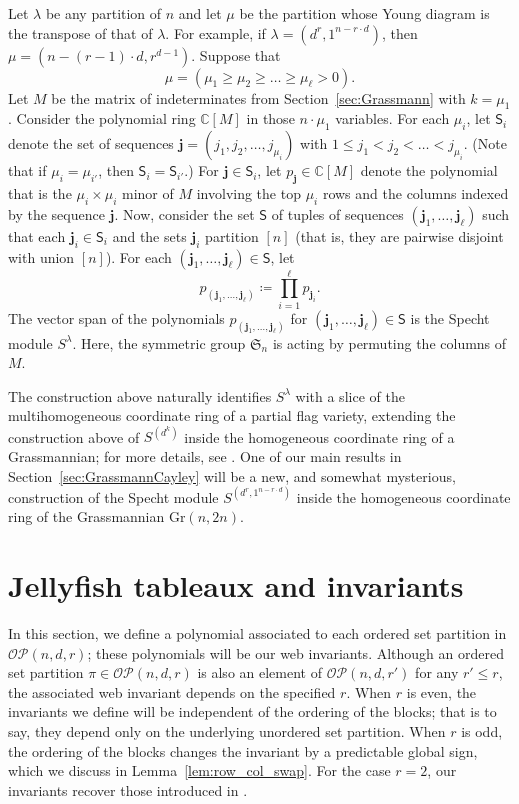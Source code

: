 \documentclass[10pt]{amsart}
\theoremstyle{definition}
\theoremstyle{plain}
\theoremstyle{plain}
\theoremstyle{definition}
\theoremstyle{remark}
\theoremstyle{plain}
\theoremstyle{plain}
\theoremstyle{plain}
\numberwithin{equation}{section}
\newcommand{\Gr}{\mathrm{Gr}}
\newcommand{\ordsetpart}{\mathcal{OP}}
\begin{document}
Let $\lambda$ be any partition of $n$ and let $\mu$ be the partition whose Young diagram is the transpose of that of $\lambda$. For example, if $\lambda = (d^r,1^{n - r \cdot d})$, then $\mu  = (n - (r-1) \cdot d, r^{d-1})$. Suppose that 
\[
\mu = (\mu_1 \geq \mu_2 \geq \dots \geq \mu_\ell > 0).
\]
Let $M$ be the matrix of indeterminates from Section~\ref{sec:Grassmann} with $k = \mu_1$. Consider the polynomial ring $\mathbb{C}[M]$ in those $n \cdot \mu_1$ variables. For each $\mu_i$, let $\mathsf{S}_i$ denote the set of sequences $\mathbf{j} = (j_1, j_2, \dots, j_{\mu_i})$ with $1 \leq j_1 < j_2 < \dots < j_{\mu_i}$. (Note that if $\mu_i = \mu_{i'}$, then $\mathsf{S}_i = \mathsf{S}_{i'}$.) For $\mathbf{j} \in \mathsf{S}_i$, let $p_{\mathbf{j}} \in \mathbb{C}[M]$ denote the polynomial that is the $\mu_i \times \mu_i$ minor of $M$ involving the top $\mu_i$ rows and the columns indexed by the sequence $\mathbf{j}$. Now, consider the set $\mathsf{S}$ of tuples of sequences $(\mathbf{j}_1, \dots, \mathbf{j}_\ell)$ such that each $\mathbf{j}_i \in \mathsf{S}_i$ and the sets $\mathbf{j}_i$ partition $[n]$ (that is, they are pairwise disjoint with union $[n]$).
For each $(\mathbf{j}_1, \dots, \mathbf{j}_\ell) \in \mathsf{S}$, let \[
p_{(\mathbf{j}_1, \dots, \mathbf{j}_\ell)} \coloneqq \prod_{i=1}^\ell p_{\mathbf{j}_i}.
\]
The vector span of the polynomials $p_{(\mathbf{j}_1, \dots, \mathbf{j}_\ell)}$ for $(\mathbf{j}_1, \dots, \mathbf{j}_\ell) \in \mathsf{S}$ is the Specht module $S^\lambda$. Here, the symmetric group $\mathfrak{S}_n$ is acting by permuting the columns of $M$.

The construction above naturally identifies $S^\lambda$ with a slice of the multihomogeneous coordinate ring of a partial flag variety, extending the construction above of $S^{(d^k)}$ inside the homogeneous coordinate ring of a Grassmannian; for more details, see \cite[\S2.3]{Patrias.Pechenik.Striker}.
One of our main results in Section~\ref{sec:GrassmannCayley} will be a new, and somewhat mysterious, construction of the Specht module $S^{(d^r,1^{n-r\cdot d})}$ inside the homogeneous coordinate ring of the Grassmannian $\Gr(n,2n)$.

\section{Jellyfish tableaux and  invariants}
\label{sec:invariants}
In this section, we define a polynomial associated to each ordered set partition in $\ordsetpart(n,d,r)$; these polynomials will be our web invariants. Although an ordered set partition $\pi \in \ordsetpart(n,d,r)$ is also an element of $\ordsetpart(n,d,r')$ for any $r' \leq r$, the associated web invariant depends on the specified $r$. When $r$ is even, the invariants we define will be independent of the ordering of the blocks; that is to say, they depend only on the underlying unordered set partition. When $r$ is odd, the ordering of the blocks changes the invariant by a predictable global sign, which we discuss in Lemma~\ref{lem:row_col_swap}. For the case $r=2$, our invariants recover those introduced in \cite{Patrias.Pechenik.Striker}.
\end{document}
